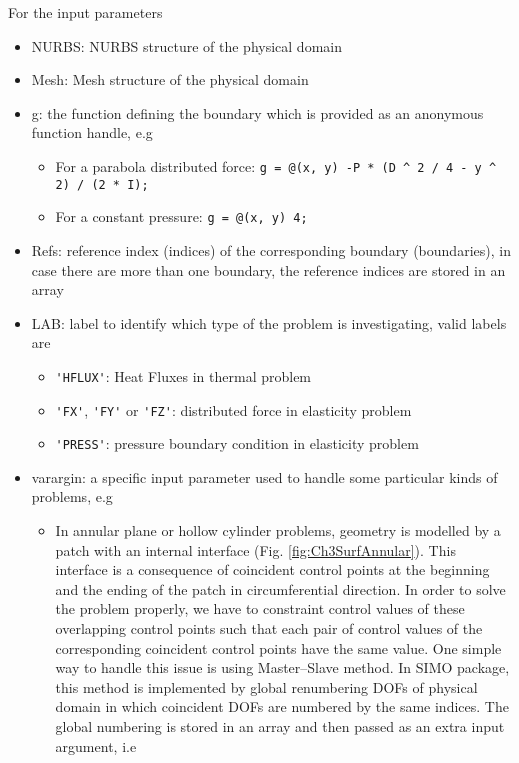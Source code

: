 For the input parameters
\begin{itemize}
    \item NURBS: NURBS structure of the physical domain
    \item Mesh: Mesh structure of the physical domain
    \item g: the function defining the boundary which is provided as an anonymous function handle, e.g
    \begin{itemize}
        \item For a parabola distributed force: \lstinline{g = @(x, y) -P * (D ^ 2 / 4 - y ^ 2) / (2 * I);}
        \item For a constant pressure: \lstinline{g = @(x, y) 4;}
    \end{itemize}
    \item Refs: reference index (indices) of the corresponding boundary (boundaries), in case there are more than one boundary, the reference indices are stored in an array
    \item LAB: label to identify which type of the problem is investigating, valid labels are
    \begin{itemize}
        \item \lstinline{'HFLUX'}: Heat Fluxes in thermal problem
        \item \lstinline{'FX'}, \lstinline{'FY'} or \lstinline{'FZ'}: distributed force in elasticity problem
        \item \lstinline{'PRESS'}: pressure boundary condition in elasticity problem
    \end{itemize}
    \item varargin: a specific input parameter used to handle some particular kinds of problems, e.g
    \begin{itemize}
        \item In annular plane or hollow cylinder problems, geometry is modelled by a patch with an internal interface (Fig. \ref{fig:Ch3SurfAnnular}). This interface is a consequence of coincident control points at the beginning and the ending of the patch in circumferential direction. In order to solve the problem properly, we have to constraint control values of these overlapping control points such that each pair of control values of the corresponding coincident control points have the same value. One simple way to handle this issue is using Master--Slave method. In SIMO package, this method is implemented by global renumbering DOFs of physical domain in which coincident DOFs are numbered by the same indices. The global numbering is stored in an array and then passed as an extra input argument, i.e

\end{itemize}
\end{itemize}
